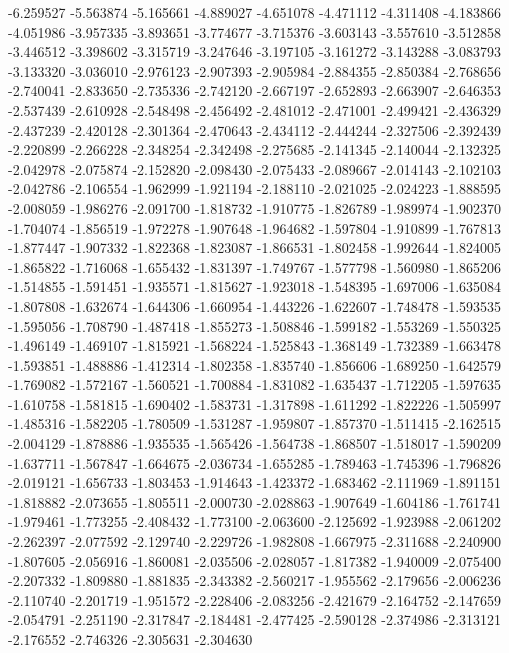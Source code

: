 -6.259527
-5.563874
-5.165661
-4.889027
-4.651078
-4.471112
-4.311408
-4.183866
-4.051986
-3.957335
-3.893651
-3.774677
-3.715376
-3.603143
-3.557610
-3.512858
-3.446512
-3.398602
-3.315719
-3.247646
-3.197105
-3.161272
-3.143288
-3.083793
-3.133320
-3.036010
-2.976123
-2.907393
-2.905984
-2.884355
-2.850384
-2.768656
-2.740041
-2.833650
-2.735336
-2.742120
-2.667197
-2.652893
-2.663907
-2.646353
-2.537439
-2.610928
-2.548498
-2.456492
-2.481012
-2.471001
-2.499421
-2.436329
-2.437239
-2.420128
-2.301364
-2.470643
-2.434112
-2.444244
-2.327506
-2.392439
-2.220899
-2.266228
-2.348254
-2.342498
-2.275685
-2.141345
-2.140044
-2.132325
-2.042978
-2.075874
-2.152820
-2.098430
-2.075433
-2.089667
-2.014143
-2.102103
-2.042786
-2.106554
-1.962999
-1.921194
-2.188110
-2.021025
-2.024223
-1.888595
-2.008059
-1.986276
-2.091700
-1.818732
-1.910775
-1.826789
-1.989974
-1.902370
-1.704074
-1.856519
-1.972278
-1.907648
-1.964682
-1.597804
-1.910899
-1.767813
-1.877447
-1.907332
-1.822368
-1.823087
-1.866531
-1.802458
-1.992644
-1.824005
-1.865822
-1.716068
-1.655432
-1.831397
-1.749767
-1.577798
-1.560980
-1.865206
-1.514855
-1.591451
-1.935571
-1.815627
-1.923018
-1.548395
-1.697006
-1.635084
-1.807808
-1.632674
-1.644306
-1.660954
-1.443226
-1.622607
-1.748478
-1.593535
-1.595056
-1.708790
-1.487418
-1.855273
-1.508846
-1.599182
-1.553269
-1.550325
-1.496149
-1.469107
-1.815921
-1.568224
-1.525843
-1.368149
-1.732389
-1.663478
-1.593851
-1.488886
-1.412314
-1.802358
-1.835740
-1.856606
-1.689250
-1.642579
-1.769082
-1.572167
-1.560521
-1.700884
-1.831082
-1.635437
-1.712205
-1.597635
-1.610758
-1.581815
-1.690402
-1.583731
-1.317898
-1.611292
-1.822226
-1.505997
-1.485316
-1.582205
-1.780509
-1.531287
-1.959807
-1.857370
-1.511415
-2.162515
-2.004129
-1.878886
-1.935535
-1.565426
-1.564738
-1.868507
-1.518017
-1.590209
-1.637711
-1.567847
-1.664675
-2.036734
-1.655285
-1.789463
-1.745396
-1.796826
-2.019121
-1.656733
-1.803453
-1.914643
-1.423372
-1.683462
-2.111969
-1.891151
-1.818882
-2.073655
-1.805511
-2.000730
-2.028863
-1.907649
-1.604186
-1.761741
-1.979461
-1.773255
-2.408432
-1.773100
-2.063600
-2.125692
-1.923988
-2.061202
-2.262397
-2.077592
-2.129740
-2.229726
-1.982808
-1.667975
-2.311688
-2.240900
-1.807605
-2.056916
-1.860081
-2.035506
-2.028057
-1.817382
-1.940009
-2.075400
-2.207332
-1.809880
-1.881835
-2.343382
-2.560217
-1.955562
-2.179656
-2.006236
-2.110740
-2.201719
-1.951572
-2.228406
-2.083256
-2.421679
-2.164752
-2.147659
-2.054791
-2.251190
-2.317847
-2.184481
-2.477425
-2.590128
-2.374986
-2.313121
-2.176552
-2.746326
-2.305631
-2.304630
